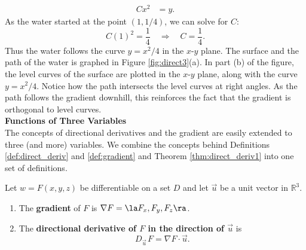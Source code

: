 {\begin{align*}
Cx^2 &= y.
\end{align*}
As the water started at the point $(1,1/4)$, we can solve for $C$:
$$C(1)^2 = \frac14 \quad \Rightarrow \quad C = \frac14.$$
Thus the water follows the curve $y=x^2/4$ in the $x$-$y$ plane. The surface and the path of the water is graphed in Figure \ref{fig:direct3}(a). In part (b) of the figure, the level curves of the surface are plotted in the $x$-$y$ plane, along with the curve $y=x^2/4$. Notice how the path intersects the level curves at right angles. As the path follows the gradient downhill, this reinforces the fact that the gradient is orthogonal to level curves.
}\\

\noindent\textbf{\large Functions of Three Variables}\\

The concepts of directional derivatives and the gradient are easily extended to three (and more) variables. We combine the concepts behind Definitions \ref{def:direct_deriv} and \ref{def:gradient} and Theorem \ref{thm:direct_deriv1} into one set of definitions.

{Let $w=F(x,y,z)$ be differentiable on a set $D$ and let $\vec u $ be a unit vector in $\mathbb{R}^3$.
\begin{enumerate}
	\item	The \textbf{gradient} of $F$ is $\nabla F = \la F_x,F_y,F_z\ra$.
	\item The \textbf{directional derivative of $F$ in the direction of $\vec u$} is $$D_{\vec u\,}F=\nabla F\cdot \vec u.$$
\end{enumerate}
}

